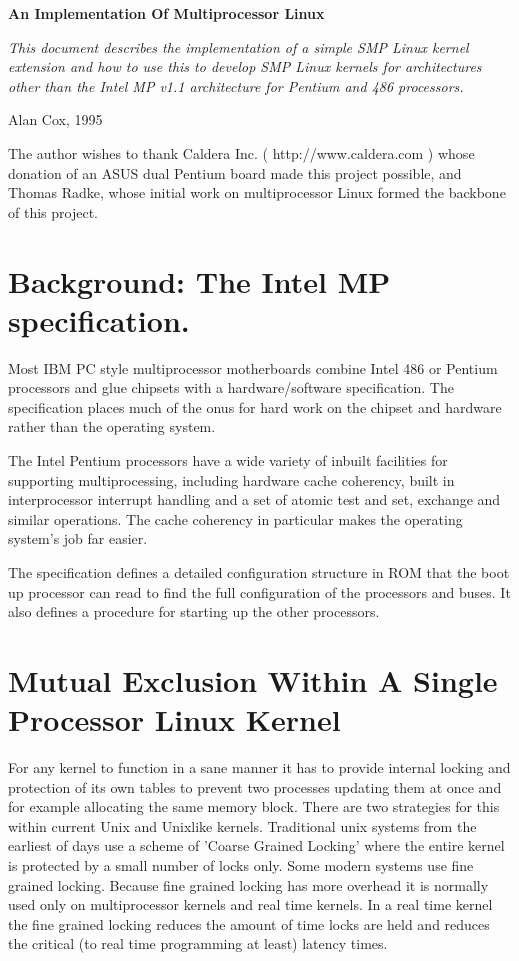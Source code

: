 \documentclass[]{article}
\begin{document}
\begin{center}
\LARGE \bf
An Implementation Of Multiprocessor Linux
\normalsize
\end{center}

{ \it
This document describes the implementation of a simple SMP 
Linux kernel extension and how to use this to develop SMP Linux kernels for 
architectures other than the Intel MP v1.1 architecture for Pentium and 486 
processors.}

\hfill Alan Cox, 1995


The author wishes to thank Caldera Inc. ( http://www.caldera.com )
whose donation of an ASUS dual Pentium board made this project possible, 
and Thomas Radke, whose initial work on multiprocessor Linux formed 
the backbone of this project.

\section{Background: The Intel MP specification.}
Most IBM PC style multiprocessor motherboards combine Intel 486 or Pentium 
processors and glue chipsets with a hardware/software specification. The 
specification places much of the onus for hard work on the chipset and 
hardware rather than the operating system.

The Intel Pentium processors have a wide variety of inbuilt facilities for 
supporting multiprocessing, including hardware cache coherency, built in 
interprocessor interrupt handling and a set of atomic test and set, 
exchange and similar operations. The cache coherency in particular makes the 
operating system's job far easier.

The specification defines a detailed configuration structure in ROM that 
the boot up processor can read to find the full configuration of the 
processors and buses. It also defines a procedure for starting up the 
other processors.


\section{Mutual Exclusion Within A Single Processor Linux Kernel}
For any kernel to function in a sane manner it has to provide internal 
locking and protection of its own tables to prevent two processes updating 
them at once and for example allocating the same memory block. There are 
two strategies for this within current Unix and Unixlike kernels. 
Traditional unix systems from the earliest of days use a scheme of 'Coarse 
Grained Locking' where the entire kernel is protected by a small number of 
locks only. Some modern systems use fine grained locking. Because fine 
grained locking has more overhead it is normally used only on 
multiprocessor kernels and real time kernels. In a real time kernel the 
fine grained locking reduces the amount of time locks are held and reduces 
the critical (to real time programming at least) latency times.
\end{document}
